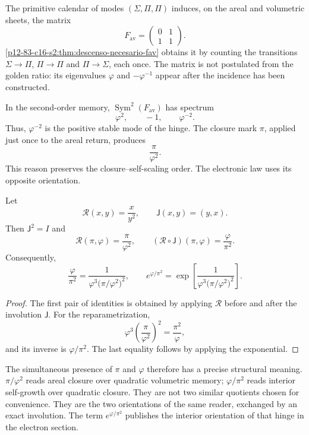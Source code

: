The primitive calendar of modes
\((\Sigma,\Pi,\Pi)\) induces, on the areal and volumetric sheets, the matrix
\[
 F_{\mathrm{av}}
 =
 \begin{pmatrix}
 0&1\\
 1&1
 \end{pmatrix}.
\]
\cref{p12-83-c16-s2:thm:descenso-necesario-fav} obtains it by counting the transitions
\(\Sigma\to\Pi\), \(\Pi\to\Pi\) and \(\Pi\to\Sigma\), each once.
The matrix is not postulated from the golden ratio: its eigenvalues
\(\varphi\) and \(-\varphi^{-1}\) appear after the incidence has been
constructed.

In the second-order memory,
\(\operatorname{Sym}^2(F_{\mathrm{av}})\) has spectrum
\[
 \varphi^2,\qquad -1,\qquad\varphi^{-2}.
\]
Thus, \(\varphi^{-2}\) is the positive stable mode of the hinge. The closure
mark \(\pi\), applied just once to the areal return, produces
\[
 \frac{\pi}{\varphi^2}.
\]
This reason preserves the closure--self-scaling order. The electronic law uses its opposite orientation.

\begin{theorem}
\label{p12-83-c15-s2:thm:espejo-electron-rev6}
Let
\[
 \mathscr R(x,y)=\frac{x}{y^2},
 \qquad
 \mathsf J(x,y)=(y,x).
\]
Then \(\mathsf J^2=I\) and
\[
 \mathscr R(\pi,\varphi)=\frac{\pi}{\varphi^2},
 \qquad
 (\mathscr R\circ\mathsf J)(\pi,\varphi)
 =\frac{\varphi}{\pi^2}.
\]
Consequently,
\[
 \frac{\varphi}{\pi^2}
 =
 \frac{1}{
 \varphi^3\bigl(\pi/\varphi^2\bigr)^2},
 \qquad
 e^{\varphi/\pi^2}
 =
 \exp\!\left[
 \frac{1}{
 \varphi^3\bigl(\pi/\varphi^2\bigr)^2}
 \right].
\]
\end{theorem}

\begin{proof}
The first pair of identities is obtained by applying \(\mathscr R\) before
and after the involution \(\mathsf J\). For the reparametrization,
\[
 \varphi^3
 \left(\frac{\pi}{\varphi^2}\right)^2
 =\frac{\pi^2}{\varphi},
\]
and its inverse is \(\varphi/\pi^2\). The last equality follows by applying
the exponential.
\end{proof}

The simultaneous presence of \(\pi\) and \(\varphi\) therefore has a precise structural meaning. \(\pi/\varphi^2\) reads areal closure over quadratic volumetric memory; \(\varphi/\pi^2\) reads interior self-growth over quadratic closure. They are not two similar quotients chosen for convenience. They are the two orientations of the same reader, exchanged by an exact involution. The term \(e^{\varphi/\pi^2}\) publishes the interior orientation of that hinge in the electron section.

